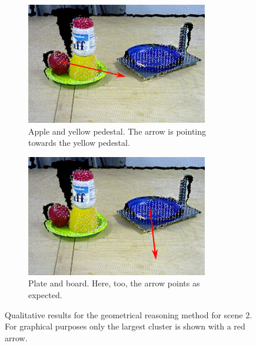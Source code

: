 \begin{figure}
\begin{subfigure}[t]{0.475\textwidth}
    \includegraphics[width=\textwidth]{./figures/sec/geometrical_reasoning/affordance_arrow_scene7_3.jpg}
    \caption{Apple and yellow pedestal. The arrow is pointing towards the yellow pedestal.}
    \label{fig:sec_enriched_geometricalreasoning_experiments_scene2_3}
  \end{subfigure}
  \hfill
  \begin{subfigure}[t]{0.475\textwidth}
    \includegraphics[width=\textwidth]{./figures/sec/geometrical_reasoning/affordance_arrow_scene7_4.png}
    \caption{Plate and board. Here, too, the arrow points as expected.}
    \label{fig:sec_enriched_geometricalreasoning_experiments_scene2_4}
  \end{subfigure}
  \caption{Qualitative results for the geometrical reasoning method for scene 2. For graphical purposes only the largest cluster is shown with a red arrow.}
  \label{fig:sec_enriched_geometricalreasoning_experiments_scene2}
\end{figure}

